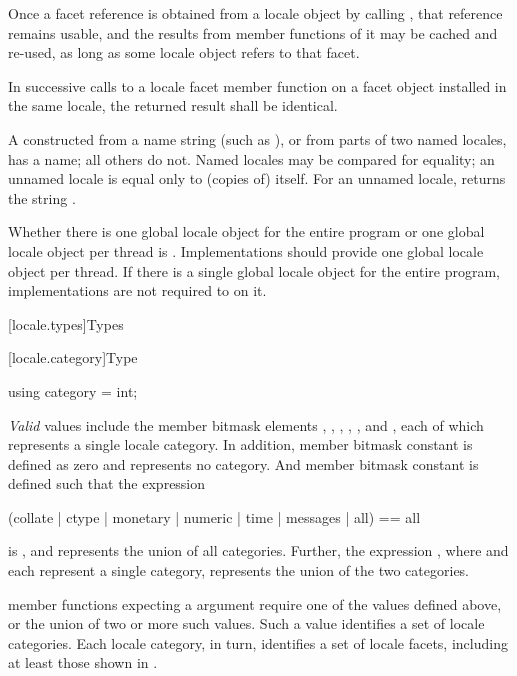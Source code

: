 \pnum
Once a facet reference is obtained from a locale object by calling
,
that reference remains usable, and the results from member functions
of it may be cached and re-used, as long as some locale object refers
to that facet.

\pnum
In successive calls to a locale facet member function on a facet object
installed in the same locale, the returned result shall be identical.

\pnum
A
constructed from a name string (such as ), or from parts of
two named locales, has a name; all others do not.
Named locales may be compared for equality; an unnamed locale is equal
only to (copies of) itself.
For an unnamed locale,
returns the string
.

\pnum
Whether there is one global locale object for the entire program or one global locale
object per thread is .
Implementations should provide one global locale object per
thread. If there is a single global locale object for the entire program,
implementations are not required to  on it.

[locale.types]{Types}


[locale.category]{Type }

%
\begin{itemdecl}
using category = int;
\end{itemdecl}

\pnum
\textit{Valid}
values include the
member bitmask elements
,
,
,
,
,
and
,
each of which represents a single locale category.
In addition,
member bitmask constant
is defined as zero and represents no category. And
member bitmask constant
is defined such that the expression
\begin{codeblock}
(collate | ctype | monetary | numeric | time | messages | all) == all
\end{codeblock}
is
,
and represents the union of all categories.
Further, the expression
,
where
and
each represent a single category, represents the union of the two categories.

\pnum
{}
member functions expecting a
argument require one of the
values defined above, or the union of two or more such values.
Such a
value identifies a set of locale categories.
Each locale category,
in turn, identifies a set of locale facets, including at least those
shown in .

